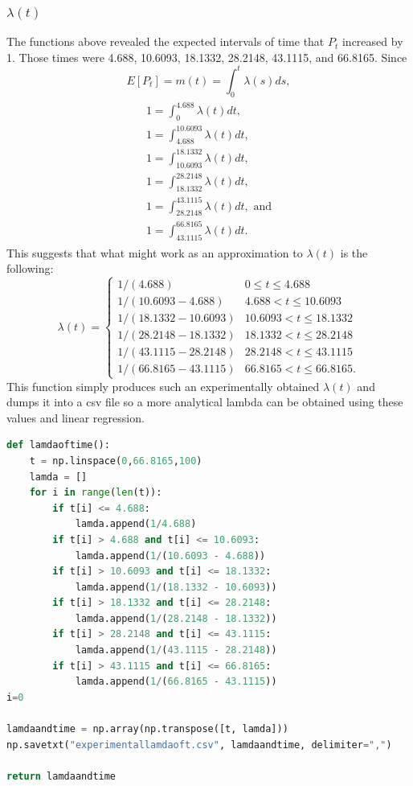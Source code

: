 \documentclass{article}
\begin{document}
\subsubsection{$\lambda(t)$}
The functions above revealed the expected intervals of time that $P_t$ increased by 1. Those times were 4.688, 10.6093, 18.1332, 28.2148, 43.1115, and 66.8165. Since \cite{geeks4geeeks}
\begin{equation}\label{m1}
E[P_t] = m(t) = \int_{0}^{t} \lambda(s)ds,
\end{equation}
\begin{align}\label{expectation}
\begin{split}
1 = \int_{0}^{4.688}\lambda(t)dt,
\\
1 = \int_{4.688}^{10.6093}\lambda(t)dt,
\\
1 = \int_{10.6093}^{18.1332}\lambda(t)dt,
\\
1 = \int_{18.1332}^{28.2148}\lambda(t)dt,
\\
1 = \int_{28.2148}^{43.1115}\lambda(t)dt, \text{ and}
\\
1 = \int_{43.1115}^{66.8165}\lambda(t)dt.
\end{split}
\end{align}
This suggests that what might work as an approximation to $\lambda(t)$ is the following:
\begin{equation}\label{lambda}
\lambda(t) = 
\begin{cases} 
1/(4.688) & 0 \leq t \leq 4.688 \\
1/(10.6093 - 4.688) & 4.688 < t \leq 10.6093 \\
1/(18.1332 - 10.6093) & 10.6093 < t \leq 18.1332 \\
1/(28.2148 - 18.1332) & 18.1332 < t \leq 28.2148 \\
1/(43.1115 - 28.2148) & 28.2148 < t \leq 43.1115 \\
1/(66.8165 - 43.1115) & 66.8165 < t \leq 66.8165. 
\end{cases}
\end{equation}
This function simply produces such an experimentally obtained $\lambda(t)$ and dumps it into a csv file so a more analytical lambda can be obtained using these values and linear regression.
\begin{lstlisting}[language=Python]
def lamdaoftime():
    t = np.linspace(0,66.8165,100)
    lamda = []
    for i in range(len(t)):
        if t[i] <= 4.688:
            lamda.append(1/4.688)
        if t[i] > 4.688 and t[i] <= 10.6093:
            lamda.append(1/(10.6093 - 4.688))
        if t[i] > 10.6093 and t[i] <= 18.1332:
            lamda.append(1/(18.1332 - 10.6093))
        if t[i] > 18.1332 and t[i] <= 28.2148:
            lamda.append(1/(28.2148 - 18.1332))
        if t[i] > 28.2148 and t[i] <= 43.1115:
            lamda.append(1/(43.1115 - 28.2148))
        if t[i] > 43.1115 and t[i] <= 66.8165:
            lamda.append(1/(66.8165 - 43.1115))
i=0

lamdaandtime = np.array(np.transpose([t, lamda]))
np.savetxt("experimentallamdaoft.csv", lamdaandtime, delimiter=",")

return lamdaandtime
\end{lstlisting}
\end{document}
